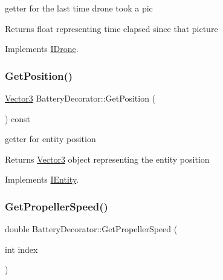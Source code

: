 getter for the last time drone took a pic 

\begin{DoxyReturn}{Returns}
float representing time elapsed since that picture 
\end{DoxyReturn}


Implements \hyperlink{classIDrone_a112d19971ac7d94dba9e2f25ad667c0d}{I\+Drone}.

\mbox{\label{classBatteryDecorator_aaf2487adf2d58e855268877427cf5ba9}} 
\subsubsection{\texorpdfstring{Get\+Position()}{GetPosition()}}
{\footnotesize\ttfamily \hyperlink{classVector3}{Vector3} Battery\+Decorator\+::\+Get\+Position (\begin{DoxyParamCaption}{ }\end{DoxyParamCaption}) const\hspace{0.3cm}{\ttfamily [virtual]}}



getter for entity position 

\begin{DoxyReturn}{Returns}
\hyperlink{classVector3}{Vector3} object representing the entity position 
\end{DoxyReturn}


Implements \hyperlink{classIEntity_a9bc32587aab91761fc0e718612498199}{I\+Entity}.

\mbox{\label{classBatteryDecorator_a361154605b803347aea2422cae7d0183}} 
\subsubsection{\texorpdfstring{Get\+Propeller\+Speed()}{GetPropellerSpeed()}}
{\footnotesize\ttfamily double Battery\+Decorator\+::\+Get\+Propeller\+Speed (\begin{DoxyParamCaption}\item[{int}]{index }\end{DoxyParamCaption})\hspace{0.3cm}{\ttfamily [virtual]}}



